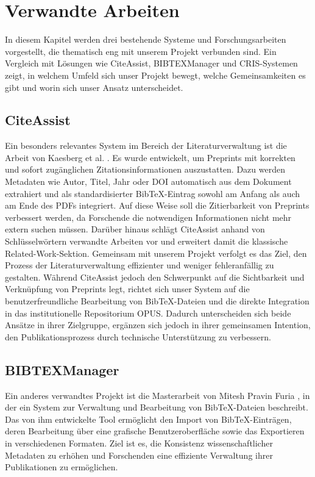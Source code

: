 \chapter{Verwandte Arbeiten}
In diesem Kapitel werden drei bestehende Systeme und Forschungsarbeiten 
vorgestellt, die thematisch eng mit unserem Projekt verbunden sind. 
Ein Vergleich mit Lösungen wie CiteAssist, BIBTEXManager und CRIS-Systemen 
zeigt, in welchem Umfeld sich unser Projekt bewegt, welche Gemeinsamkeiten 
es gibt und worin sich unser Ansatz unterscheidet.

\section{CiteAssist}
Ein besonders relevantes System im Bereich der Literaturverwaltung ist die Arbeit von  
Kaesberg et al. \cite{kaesberg2024citeassist}. 
Es wurde entwickelt, um Preprints mit korrekten und sofort 
zugänglichen Zitationsinformationen auszustatten. Dazu werden 
Metadaten wie Autor, Titel, Jahr oder DOI automatisch aus dem 
Dokument extrahiert und als standardisierter BibTeX-Eintrag 
sowohl am Anfang als auch am Ende des PDFs integriert. Auf 
diese Weise soll die Zitierbarkeit von Preprints verbessert 
werden, da Forschende die notwendigen Informationen nicht 
mehr extern suchen müssen. Darüber hinaus schlägt CiteAssist 
anhand von Schlüsselwörtern verwandte Arbeiten vor und 
erweitert damit die klassische Related-Work-Sektion. 
Gemeinsam mit unserem Projekt verfolgt es das Ziel, 
den Prozess der Literaturverwaltung effizienter und 
weniger fehleranfällig zu gestalten. Während CiteAssist 
jedoch den Schwerpunkt auf die Sichtbarkeit und Verknüpfung 
von Preprints legt, richtet sich unser System auf die 
benutzerfreundliche Bearbeitung von BibTeX-Dateien und 
die direkte Integration in das institutionelle Repositorium 
OPUS. Dadurch unterscheiden sich beide Ansätze in ihrer 
Zielgruppe, ergänzen sich jedoch in ihrer gemeinsamen Intention, 
den Publikationsprozess durch technische Unterstützung zu verbessern.

\section{BIBTEXManager}

Ein anderes  verwandtes Projekt ist die Masterarbeit von Mitesh Pravin Furia \cite{furia2009}, in der ein 
System zur Verwaltung und Bearbeitung von Bib\TeX{}-Dateien beschreibt. 
Das von ihm entwickelte Tool ermöglicht den Import von Bib\TeX{}-Einträgen, 
deren Bearbeitung über eine grafische Benutzeroberfläche sowie das Exportieren 
in verschiedenen Formaten. Ziel ist es, die Konsistenz wissenschaftlicher 
Metadaten zu erhöhen und Forschenden eine effiziente Verwaltung ihrer 
Publikationen zu ermöglichen.\\

